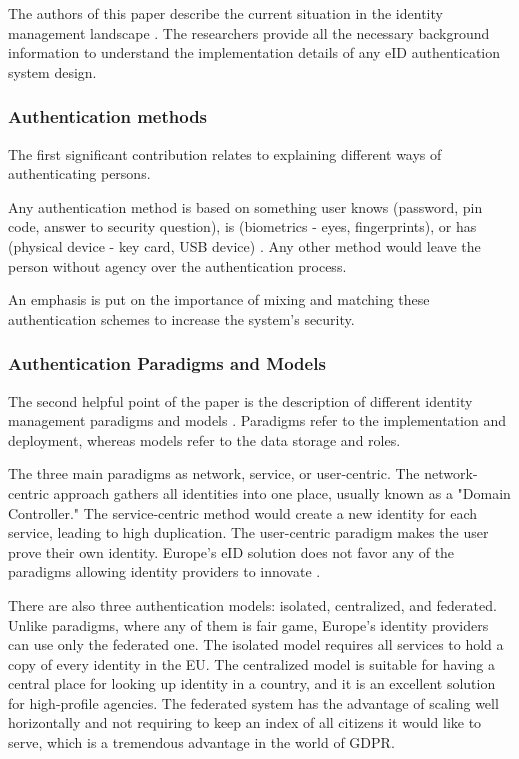 The authors of this paper describe the current situation in the identity management landscape \cite{federated-europe-identity}. The researchers provide all the necessary background information to understand the implementation details of any eID authentication system design.

\subsubsection{Authentication methods}

The first significant contribution relates to explaining different ways of authenticating persons.

Any authentication method is based on something user knows (password, pin code, answer to security question), is (biometrics - eyes, fingerprints), or has (physical device - key card, USB device) \cite{o2003comparing}. Any other method would leave the person without agency over the authentication process.

An emphasis is put on the importance of mixing and matching these authentication schemes to increase the system's security.

\subsubsection{Authentication Paradigms and Models}

The second helpful point of the paper is the description of different identity management paradigms and models \cite{identity-paradigms}. Paradigms refer to the implementation and deployment, whereas models refer to the data storage and roles.

The three main paradigms as network, service, or user-centric. The network-centric approach gathers all identities into one place, usually known as a "Domain Controller." The service-centric method would create a new identity for each service, leading to high duplication. The user-centric paradigm makes the user prove their own identity. Europe's eID solution does not favor any of the paradigms allowing identity providers to innovate \cite{eelaw-idcard,eeid,dokobit}.

There are also three authentication models: isolated, centralized, and federated. Unlike paradigms, where any of them is fair game, Europe's identity providers can use only the federated one. The isolated model requires all services to hold a copy of every identity in the EU. The centralized model is suitable for having a central place for looking up identity in a country, and it is an excellent solution for high-profile agencies. The federated system has the advantage of scaling well horizontally and not requiring to keep an index of all citizens it would like to serve, which is a tremendous advantage in the world of GDPR.

